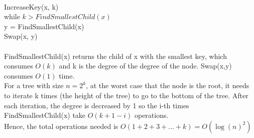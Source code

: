 \begin{problem}{3} ~\\
IncreaseKey(x, k)\\
while $k > FindSmallestChild(x)$ \\
\tab y = FindSmallestChild(x) \\
\tab Swap(x, y)\\
\\
FindSmallestChild(x) returns the child of x with the smallest key, which consumes $O(k)$ and k is the degree of the degree of the node. Swap(x,y) consumes $O(1)$ time. \\
For a tree with size $n=2^{k}$, at the worst case that the node is the root, it needs to iterate k times (the height of the tree) to go to the bottom of the tree. After each iteration, the degree is decreased by 1 so the i-th times FindSmallestChild(x) take $O(k+1-i)$ operations.\\
Hence, the total operations needed is $O(1+2+3+...+k) =  O(\log(n)^2)$\\
\end{problem}